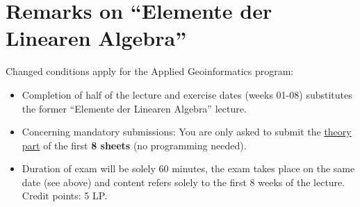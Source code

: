 \documentclass{article}
\begin{document}
\section{Remarks on ``Elemente der Linearen Algebra''}
Changed conditions apply for the Applied Geoinformatics program:
\begin{itemize}
	\item Completion of half of the lecture and exercise dates (weeks 01-08) substitutes the former ``Elemente der Linearen Algebra'' lecture. 
	\item Concerning mandatory submissions: You are only asked to submit the \underline{theory part} of the first \textbf{8 sheets} (no programming needed).
	\item Duration of exam will be solely 60 minutes, the exam takes place on the same date (see above) and content refers solely to the first 8 weeks of the lecture. Credit points: 5 LP.
\end{itemize}
\end{document}
